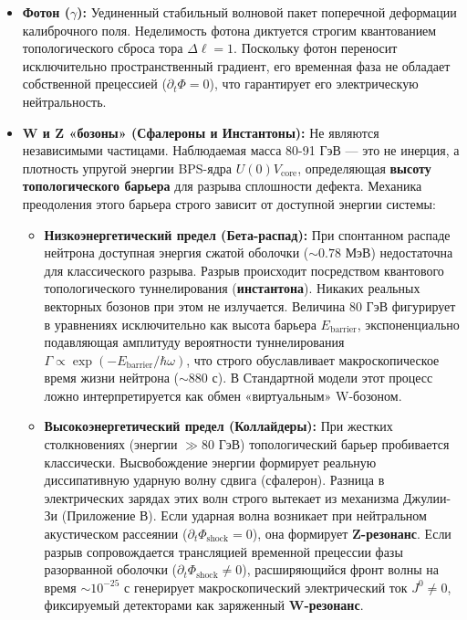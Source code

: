 \documentclass[11pt,a4paper]{article}
\begin{document}
\begin{itemize}
    \item \textbf{Фотон ($\gamma$):} Уединенный стабильный волновой пакет поперечной деформации калиброчного поля. Неделимость фотона диктуется строгим квантованием топологического сброса тора $\Delta \ell = 1$. Поскольку фотон переносит исключительно пространственный градиент, его временная фаза не обладает собственной прецессией ($\partial_t \Phi = 0$), что гарантирует его электрическую нейтральность.
    
    \item \textbf{W и Z «бозоны» (Сфалероны и Инстантоны):} Не являются независимыми частицами. Наблюдаемая масса 80-91 ГэВ — это не инерция, а плотность упругой энергии BPS-ядра $U(0)V_{\text{core}}$, определяющая \textbf{высоту топологического барьера} для разрыва сплошности дефекта. Механика преодоления этого барьера строго зависит от доступной энергии системы:
    \begin{itemize}
        \item \textbf{Низкоэнергетический предел (Бета-распад):} При спонтанном распаде нейтрона доступная энергия сжатой оболочки ($\sim 0.78$ МэВ) недостаточна для классического разрыва. Разрыв происходит посредством квантового топологического туннелирования (\textbf{инстантона}). Никаких реальных векторных бозонов при этом не излучается. Величина 80 ГэВ фигурирует в уравнениях исключительно как высота барьера $E_{\text{barrier}}$, экспоненциально подавляющая амплитуду вероятности туннелирования $\Gamma \propto \exp(-E_{\text{barrier}}/\hbar \omega)$, что строго обуславливает макроскопическое время жизни нейтрона ($\sim 880$ с). В Стандартной модели этот процесс ложно интерпретируется как обмен «виртуальным» W-бозоном.
        \item \textbf{Высокоэнергетический предел (Коллайдеры):} При жестких столкновениях (энергии $\gg 80$ ГэВ) топологический барьер пробивается классически. Высвобождение энергии формирует реальную диссипативную ударную волну сдвига (сфалерон). Разница в электрических зарядах этих волн строго вытекает из механизма Джулии-Зи (Приложение В). Если ударная волна возникает при нейтральном акустическом рассеянии ($\partial_t \Phi_{\text{shock}} = 0$), она формирует \textbf{Z-резонанс}. Если разрыв сопровождается трансляцией временной прецессии фазы разорванной оболочки ($\partial_t \Phi_{\text{shock}} \neq 0$), расширяющийся фронт волны на время $\sim 10^{-25}$ с генерирует макроскопический электрический ток $J^0 \neq 0$, фиксируемый детекторами как заряженный \textbf{W-резонанс}.
    \end{itemize}
\end{itemize}
	
\end{document}
